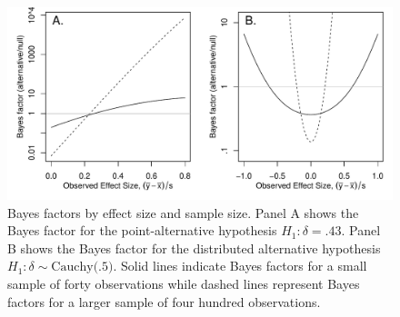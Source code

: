 \documentclass[man]{apa6}
\begin{document}
\begin{figure}
\includegraphics[width=\textwidth, keepaspectratio]{BFfigure2.pdf}
\caption{Bayes factors by effect size and sample size. Panel A shows the Bayes factor for the point-alternative hypothesis $H_1: \delta = .43$. Panel B shows the Bayes factor for the distributed alternative hypothesis $H_1: \delta \sim \mbox{Cauchy(.5)}$. Solid lines indicate Bayes factors for a small sample of forty observations while dashed lines represent Bayes factors for a larger sample of four hundred observations.}
\label{BFNfig}
\end{figure}
\end{document}
